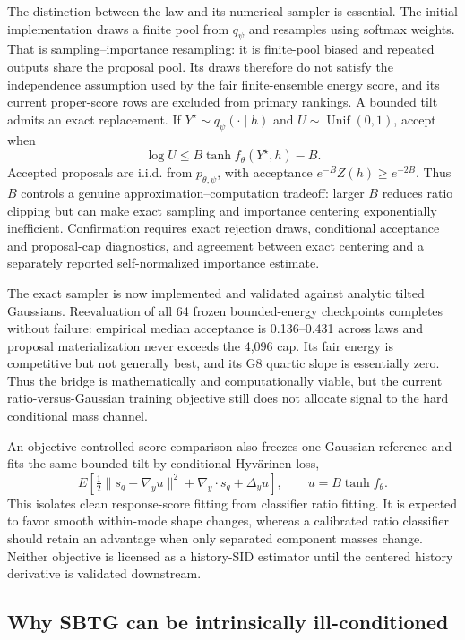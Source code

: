 \documentclass[10pt]{article}
\begin{document}
The distinction between the law and its numerical sampler is essential.  The
initial implementation draws a finite pool from $q_\psi$ and resamples using
softmax weights.  That is sampling--importance resampling: it is finite-pool
biased and repeated outputs share the proposal pool.  Its draws therefore do not
satisfy the independence assumption used by the fair finite-ensemble energy
score, and its current proper-score rows are excluded from primary rankings.  A
bounded tilt admits an exact replacement.  If $Y^\star\sim q_\psi(\cdot\mid h)$
and $U\sim\operatorname{Unif}(0,1)$, accept when
\[
  \log U\leq B\tanh f_\theta(Y^\star,h)-B.
\]
Accepted proposals are i.i.d. from $p_{\theta,\psi}$, with acceptance
$e^{-B}Z(h)\geq e^{-2B}$.  Thus $B$ controls a genuine approximation--computation
tradeoff: larger $B$ reduces ratio clipping but can make exact sampling and
importance centering exponentially inefficient.  Confirmation requires exact
rejection draws, conditional acceptance and proposal-cap diagnostics, and
agreement between exact centering and a separately reported self-normalized
importance estimate.

The exact sampler is now implemented and validated against analytic tilted
Gaussians.  Reevaluation of all 64 frozen bounded-energy checkpoints completes
without failure: empirical median acceptance is 0.136--0.431 across laws and
proposal materialization never exceeds the 4,096 cap.  Its fair energy is
competitive but not generally best, and its G8 quartic slope is essentially zero.
Thus the bridge is mathematically and computationally viable, but the current
ratio-versus-Gaussian training objective still does not allocate signal to the
hard conditional mass channel.

An objective-controlled score comparison also freezes one Gaussian reference and
fits the same bounded tilt by conditional Hyv\"arinen loss,
\[
 E\!\left[\tfrac12\|s_q+\nabla_yu\|^2+
 \nabla_y\!\cdot s_q+\Delta_yu\right],
 \qquad u=B\tanh f_\theta.
\]
This isolates clean response-score fitting from classifier ratio fitting.  It is
expected to favor smooth within-mode shape changes, whereas a calibrated ratio
classifier should retain an advantage when only separated component masses
change.  Neither objective is licensed as a history-SID estimator until the
centered history derivative is validated downstream.

\subsection{Why SBTG can be intrinsically ill-conditioned}
\end{document}

